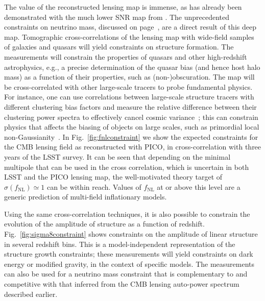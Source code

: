 \documentclass[PICOReport.tex]{subfiles}
\begin{document}
The value of the reconstructed lensing map is immense, as has already been demonstrated with the much lower \ac{SNR} map from \planck . The unprecedented constraints on neutrino mass, discussed on page~\pageref{neutrino_fundamental}, are a direct result of this deep map. Tomographic cross-correlations of the lensing map with wide-field samples of galaxies and quasars will yield constraints on structure formation. The measurements will constrain the properties of quasars and other high-redshift astrophysics, e.g., a precise determination of the quasar bias (and hence host halo mass) as a function of their properties, such as (non-)obscuration. The map will be cross-correlated with other large-scale tracers to probe fundamental physics.  For instance, one can use correlations between large-scale structure tracers with different clustering bias factors and measure the relative difference between their clustering power spectra to effectively cancel cosmic variance~\citep{2009PhRvL.102b1302S,2018PhRvD..97l3540S}; this can constrain physics that affects the biasing of objects on large scales, such as primordial local non-Gaussianity~\citep{2008PhRvD..77l3514D}.  In Fig.~\ref{fig:fnlconstraint} we show the expected constraints for the CMB lensing field as reconstructed with PICO, in cross-correlation with  three years of the LSST survey. It can be seen that depending on the minimal multipole that can be used in the cross correlation, which is uncertain in both LSST and the PICO lensing map, the well-motivated theory target of $\sigma (f_\mathrm{NL}) \simeq 1$ \citep{2014arXiv1412.4671A} can be within reach. Values of $f_\mathrm{NL}$ at or above this level are a generic prediction of multi-field inflationary models.

Using the same cross-correlation techniques, it is also possible to constrain the evolution of the amplitude of structure as a function of redshift.  Fig.~\ref{fig:sigma8constraint} shows constraints on the amplitude of linear structure in several redshift bins.  This is a model-independent representation of the structure growth constraints; these measurements will yield constraints on dark energy or modified gravity, in the context of specific models.  The measurements can also be used for a neutrino mass constraint that is complementary to and competitive with that inferred from the CMB lensing auto-power spectrum described earlier.  
\end{document}
